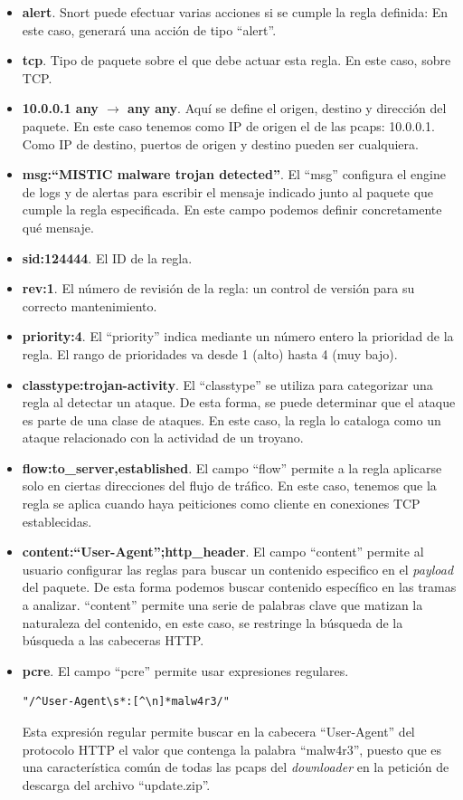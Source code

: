 \documentclass[10pt,a4paper]{article}
\begin{document}
\begin{itemize}
\item \textbf{alert}. Snort puede efectuar varias acciones si se cumple la regla definida: En este caso, generará una acción de tipo ``alert''.
\item \textbf{tcp}. Tipo de paquete sobre el que debe actuar esta regla. En este caso, sobre TCP.
\item \textbf{10.0.0.1 any $\rightarrow$ any any}. Aquí se define el origen, destino y dirección del paquete. En este caso tenemos como IP de origen el de las pcaps: 10.0.0.1. Como IP de destino, puertos de origen y destino pueden ser cualquiera.
\item \textbf{msg:``MISTIC malware trojan detected''}. El ``msg'' configura el engine de logs y de alertas para escribir el mensaje indicado junto al paquete que cumple la regla especificada. En este campo podemos definir concretamente qué mensaje.
\item \textbf{sid:124444}. El ID de la regla.
\item \textbf{rev:1}. El número de revisión de la regla: un control de versión para su correcto mantenimiento.
\item \textbf{priority:4}. El ``priority'' indica mediante un número entero la prioridad de la regla. El rango de prioridades va desde 1 (alto) hasta 4 (muy bajo).
\item \textbf{classtype:trojan-activity}. El ``classtype'' se utiliza para categorizar una regla al detectar un ataque. De esta forma, se puede determinar que el ataque es parte de una clase de ataques. En este caso, la regla lo cataloga como un ataque relacionado con la actividad de un troyano.
\item \textbf{flow:to\_server,established}. El campo ``flow'' permite a la regla aplicarse solo en ciertas direcciones del flujo de tráfico. En este caso, tenemos que la regla se aplica cuando haya peiticiones como cliente en conexiones TCP establecidas.
\item \textbf{content:``User-Agent'';http\_header}. El campo ``content'' permite al usuario configurar las reglas para buscar un contenido especifico en el \textit{payload} del paquete. De esta forma podemos buscar contenido específico en las tramas a analizar. ``content'' permite una serie de palabras clave que matizan la naturaleza del contenido, en este caso, se restringe la búsqueda de la búsqueda a las cabeceras HTTP.
\item \textbf{pcre}. El campo ``pcre'' permite usar expresiones regulares.
\begin{lstlisting}
"/^User-Agent\s*:[^\n]*malw4r3/"
\end{lstlisting}
Esta expresión regular permite buscar en la cabecera ``User-Agent'' del protocolo HTTP el valor que contenga la palabra ``malw4r3'', puesto que es una característica común de todas las pcaps del \textit{downloader} en la petición de descarga del archivo ``update.zip''.


\end{itemize}
\end{document}

